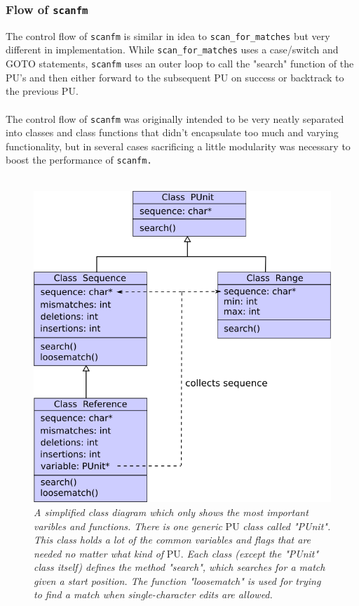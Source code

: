 \documentclass[12pt]{article}
\newcommand{\scm}{\texttt{scan\_for\_matches} }
\newcommand{\sfm}{\texttt{scanfm} }
\newcommand{\sfmp}{\texttt{scanfm.} }
\newcommand{\pu}{PU }
\newcommand{\pus}{PU's }
\newcommand{\pup}{PU. }
\begin{document}
\subsubsection{Flow of \sfm}
The control flow of \sfm is similar in idea to \scm but very different in implementation. While \scm uses a case/switch
and GOTO statements, \sfm uses an outer loop to call the "search" function of the \pus and then either
forward to the subsequent \pu on success or backtrack to the previous \pup \\ \\
The control flow of \sfm was originally intended to be very neatly separated into classes and class functions that
didn't encapsulate too much and varying functionality, but in several cases sacrificing a little modularity
was necessary to boost the performance of \sfmp \\ \\
\begin{figure}[H]
\begin{center}
\includegraphics[scale=0.65]{Diagrams/classdia.png}
\end{center}
\caption{\textit{A simplified class diagram which only shows the most important varibles and functions.
There is one generic} \pu \textit{class called "PUnit". This class holds a lot of the common variables
and flags that are needed no matter what kind of} \pup
\textit{
Each class (except the "PUnit" class itself) defines the method "search", which searches for a match given a start position. 
The function "loosematch" is used for trying to find a match when single-character edits are allowed.}}
\end{figure}
\end{document}
